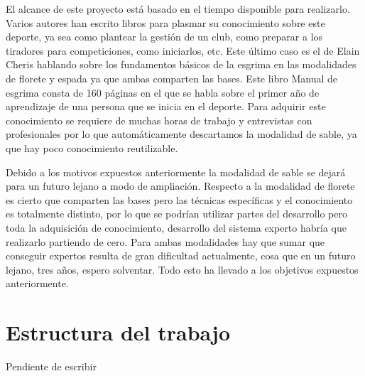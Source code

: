 El alcance de este proyecto está basado en el tiempo disponible para realizarlo.
 Varios autores han escrito libros para plasmar su conocimiento sobre este deporte,
 ya sea como plantear la gestión de un club, como preparar a los tiradores para competiciones,
 como iniciarlos, etc. Este último caso es el de Elain Cheris hablando sobre los fundamentos
 básicos de la esgrima en las modalidades de florete y espada ya que ambas comparten
 las bases. Este libro Manual de esgrima consta de 160 páginas en el que se habla sobre
 el primer año de aprendizaje de una persona que se inicia en el deporte. Para adquirir
 este conocimiento se requiere de muchas horas de trabajo y entrevistas con profesionales
 por lo que automáticamente descartamos la modalidad de sable, ya que hay poco conocimiento
 reutilizable.

Debido a los motivos expuestos anteriormente la modalidad de sable se dejará para un futuro
 lejano a modo de ampliación. Respecto a la modalidad de florete es cierto que comparten
 las bases pero las técnicas específicas y el conocimiento es totalmente distinto,
 por lo que se podrían utilizar partes del desarrollo pero toda la adquisición de
 conocimiento, desarrollo del sistema experto habría que realizarlo partiendo de cero.
 Para ambas modalidades hay que sumar que conseguir expertos resulta de gran dificultad
 actualmente, cosa que en un futuro lejano, tres años, espero solventar. Todo esto ha
 llevado a los objetivos expuestos anteriormente.

\section{Estructura del trabajo}

Pendiente de escribir
